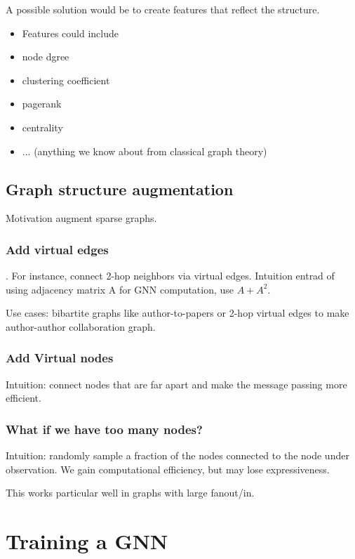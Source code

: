 \documentclass{article}
\begin{document}
A possible solution would be to create features that reflect the structure.

\begin{itemize}
	\item Features could include
	\item node dgree
	\item clustering coefficient
	\item pagerank
	\item centrality
	\item ... (anything we know about from classical graph theory)
\end{itemize}

\subsection{Graph structure augmentation}

Motivation augment sparse graphs.

\subsubsection{Add virtual edges}

. For instance, connect 2-hop neighbors via virtual edges. Intuition entrad of using adjacency matrix A for GNN computation, use $A + A^2$.

Use cases: bibartite graphs like author-to-papers or 2-hop virtual edges to make author-author collaboration graph.

\subsubsection{Add Virtual nodes}

Intuition: connect nodes that are far apart and make the message passing more efficient.

\subsubsection{What if we have too many nodes?}

Intuition: randomly sample a fraction of the nodes connected to the node under observation. We gain computational efficiency, but may lose expressiveness.

This works particular well in graphs with large fanout/in. 

\section{Training a GNN}
\end{document}
